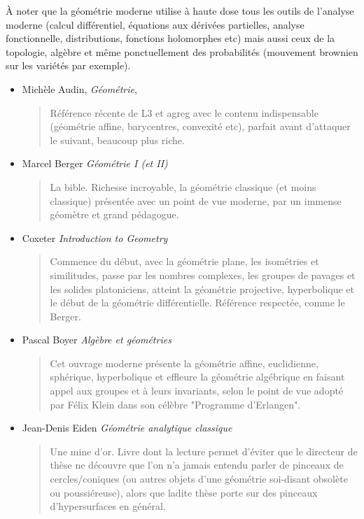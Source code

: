 \documentclass{article}
\begin{document}
À noter que la géométrie moderne utilise à haute dose tous les outils de l'analyse moderne (calcul différentiel, équations aux dérivées partielles, analyse fonctionnelle, distributions, fonctions holomorphes etc) mais aussi ceux de la topologie, algèbre et même ponctuellement des probabilités (mouvement brownien sur les variétés par exemple).
\begin{mdframed}
\begin{itemize}
\item  Michèle Audin, \emph{Géométrie}, 
\begin{quote}
Référence récente de L3 et agreg avec le contenu indispensable (géométrie affine, barycentres, convexité etc), parfait avant d'attaquer le suivant, beaucoup plus riche.
\end{quote}
\end{itemize}
\end{mdframed}
\begin{itemize}
\item Marcel Berger \emph{Géométrie I (et II)}
\begin{quote}
La bible. Richesse incroyable, la géométrie classique (et moins classique) présentée avec un point de vue moderne, par un immense géomètre et grand pédagogue.
\end{quote}
\item Coxeter \emph{Introduction to Geometry}
\begin{quote}
Commence du début, avec la géométrie plane, les isométries et similitudes, passe par les nombres complexes, les groupes de pavages et les solides platoniciens, atteint la géométrie projective, hyperbolique et le début de la géométrie différentielle. Référence respectée, comme le Berger.
\end{quote}
\item Pascal Boyer \emph{Algèbre et géométries}
\begin{quote}
Cet ouvrage moderne présente la géométrie affine, euclidienne, sphérique, hyperbolique et effleure la géométrie algébrique  en faisant appel aux groupes et à leurs invariants, selon le point de vue adopté par Félix Klein dans son célèbre "Programme d'Erlangen".
\end{quote}
\item Jean-Denis Eiden \emph{Géométrie analytique classique}
\begin{quote}
Une mine d'or. Livre dont la lecture permet d'éviter que le directeur de thèse ne découvre que l'on n'a jamais entendu parler de  pinceaux de cercles/coniques (ou autres objets d'une géométrie soi-disant obsolète ou \og poussiéreuse\fg), alors que ladite thèse porte sur des pinceaux d'hypersurfaces en général.
\end{quote}
\end{itemize}
\end{document}

